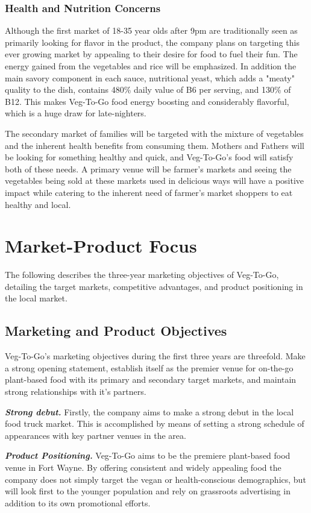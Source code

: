 \documentclass[12pt, letterpaper]{article}
\newcommand{\companyname}{Veg-To-Go}
\begin{document}
\subsubsection{Health and Nutrition Concerns}
Although the first market of 18-35 year olds after 9pm are traditionally seen as primarily looking for flavor in the product, the company plans on targeting this ever growing market by appealing to their desire for food to fuel their fun.  The energy gained from the vegetables and rice will be emphasized.  In addition the main savory component in each sauce, nutritional yeast, which adds a "meaty" quality to the dish, contains 480\% daily value of B6 per serving, and 130\% of B12. \cite{yeast} This makes \companyname{} food energy boosting and considerably flavorful, which is a huge draw for late-nighters.

The secondary market of families will be targeted with the mixture of vegetables and the inherent health benefits from consuming them.  Mothers and Fathers will be looking for something healthy and quick, and \companyname{}'s food will satisfy both of these needs. A primary venue will be farmer's markets and seeing the vegetables being sold at these markets used in delicious ways will have a positive impact while catering to the inherent need of farmer's market shoppers to eat healthy and local.

\section{Market-Product Focus}
The following describes the three-year marketing objectives of \companyname{}, detailing the target markets, competitive advantages, and product positioning in the local market.
\subsection{Marketing and Product Objectives}
\companyname's{} marketing objectives during the first three years are threefold.  Make a strong opening statement, establish itself as the premier venue for on-the-go plant-based food with its primary and secondary target markets, and maintain strong relationships with it's partners. 

\textbf{\emph{Strong debut.}} Firstly, the company aims to make a strong debut in the local food truck market.  This is accomplished by means of setting a strong schedule of appearances with key partner venues in the area.

\textbf{\emph{Product Positioning.}} \companyname{} aims to be the premiere plant-based food venue in Fort Wayne.  By offering consistent and widely appealing food the company does not simply target the vegan or health-conscious demographics, but will look first to the younger population and rely on grassroots advertising in addition to its own promotional efforts.
\end{document}
